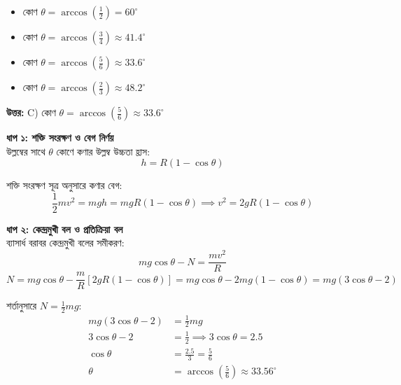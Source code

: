 \documentclass[12pt, a4paper]{article}
\begin{document}
{{%
\begin{itemize}[label={}, leftmargin=1cm, itemsep=0.5em]
    \item[\textbf{A)}] কোণ $\theta = \arccos\left(\frac{1}{2}\right) = 60^\circ$
    \item[\textbf{B)}] কোণ $\theta = \arccos\left(\frac{3}{4}\right) \approx 41.4^\circ$
    \item[\textbf{C)}] কোণ $\theta = \arccos\left(\frac{5}{6}\right) \approx 33.6^\circ$
    \item[\textbf{D)}] কোণ $\theta = \arccos\left(\frac{2}{3}\right) \approx 48.2^\circ$
\end{itemize}

\vspace{0.5em}
\begin{tcolorbox}[answerbox]
    \textbf{\color{success} উত্তর:} C) কোণ $\theta = \arccos\left(\frac{5}{6}\right) \approx 33.6^\circ$
\end{tcolorbox}
\vspace{1em}

\begin{tcolorbox}[solutionbox={সমাধান (Solution)}]
    \noindent
    \textbf{ধাপ ১: শক্তি সংরক্ষণ ও বেগ নির্ণয়} \\
    উল্লম্বের সাথে $\theta$ কোণে কণার উল্লম্ব উচ্চতা হ্রাস:
    \[ h = R (1 - \cos\theta) \]
    
    শক্তি সংরক্ষণ সূত্র অনুসারে কণার বেগ:
    \[ \frac{1}{2} m v^2 = m g h = m g R (1 - \cos\theta) \implies v^2 = 2 g R (1 - \cos\theta) \]
    
    \vspace{0.5em}
    \noindent\textbf{ধাপ ২: কেন্দ্রমুখী বল ও প্রতিক্রিয়া বল} \\
    ব্যাসার্ধ বরাবর কেন্দ্রমুখী বলের সমীকরণ:
    \[ m g \cos\theta - N = \frac{m v^2}{R} \]
    \[ N = m g \cos\theta - \frac{m}{R} [2 g R (1 - \cos\theta)] = m g \cos\theta - 2 m g (1 - \cos\theta) = m g (3\cos\theta - 2) \]
    
    শর্তানুসারে $N = \frac{1}{2} m g$:
    \begin{align*}
        m g (3\cos\theta - 2) &= \frac{1}{2} m g \\
        3\cos\theta - 2 &= \frac{1}{2} \implies 3\cos\theta = 2.5 \\
        \cos\theta &= \frac{2.5}{3} = \frac{5}{6} \\
        \theta &= \arccos\left(\frac{5}{6}\right) \approx \mathbf{33.56^\circ}
    \end{align*}
\end{tcolorbox}

}}
\end{document}
